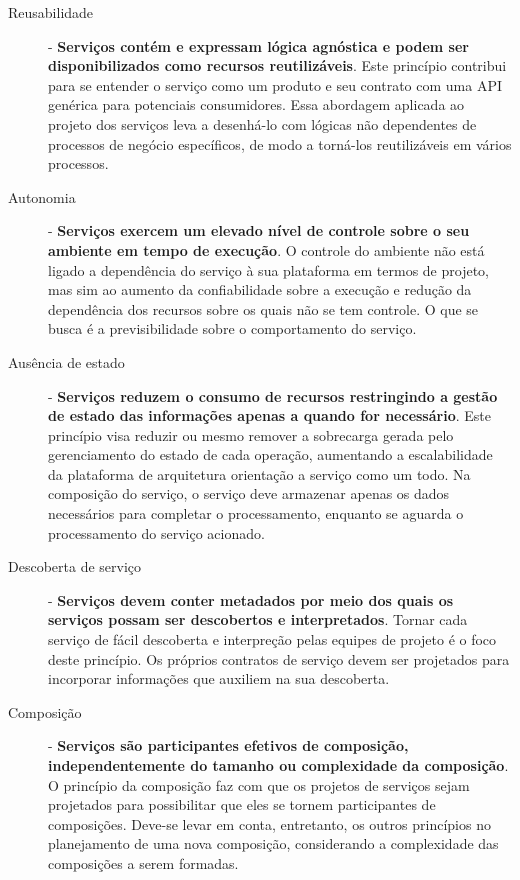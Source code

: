 \begin{description}
\item[Reusabilidade]- \textbf{Serviços contém e expressam lógica agnóstica e
podem ser disponibilizados como recursos reutilizáveis}. Este princípio
contribui para se entender o serviço como um produto e seu contrato com uma API
genérica para potenciais consumidores. Essa abordagem aplicada ao projeto dos
serviços leva a desenhá-lo com lógicas não dependentes de processos de negócio
específicos, de modo a torná-los reutilizáveis em vários processos.

\item[Autonomia]- \textbf{Serviços exercem um elevado nível de controle sobre
o seu ambiente em tempo de execução}. O controle do ambiente não está ligado a
dependência do serviço à sua plataforma em termos de projeto, mas sim ao aumento
da confiabilidade sobre a execução e redução da dependência dos recursos
sobre os quais não se tem controle.
O que se busca é a previsibilidade sobre o comportamento do serviço.

\item[Ausência de estado] - \textbf{Serviços reduzem o consumo de recursos
restringindo a gestão de estado das informações apenas a quando for necessário}.
Este princípio visa reduzir ou mesmo remover a sobrecarga gerada pelo
gerenciamento do estado de cada operação, aumentando a escalabilidade da
plataforma de arquitetura orientação a serviço como um todo. Na composição do
serviço, o serviço deve armazenar apenas os dados necessários para completar o
processamento, enquanto se aguarda o processamento do serviço acionado.

\item[Descoberta de serviço] - \textbf{Serviços devem conter metadados por meio
dos quais os serviços possam ser descobertos e interpretados}. Tornar cada
serviço de fácil descoberta e interpreção pelas equipes de projeto é o foco
deste princípio. Os próprios contratos de serviço devem ser projetados para
incorporar informações que auxiliem na sua descoberta.

\item[Composição] - \textbf{Serviços são participantes efetivos de composição,
independentemente do tamanho ou complexidade da composição}. O princípio da
composição faz com que os projetos de serviços sejam projetados para
possibilitar que eles se tornem participantes de composições. Deve-se levar em
conta, entretanto, os outros princípios no planejamento de uma nova composição,
considerando a complexidade das composições a serem formadas.

\end{description}
 

